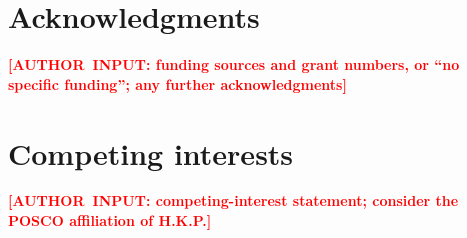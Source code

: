 \documentclass[a4paper,twocolumn,11pt,unpublished]{quantumarticle}
\newcommand{\authorinput}[1]{\textcolor{red}{\textbf{[\mbox{AUTHOR INPUT}: #1]}}}
\begin{document}
\section*{Acknowledgments}
\authorinput{funding sources and grant numbers, or ``no specific
funding''; any further acknowledgments}

\section*{Competing interests}
\authorinput{competing-interest statement; consider the POSCO
affiliation of H.K.P.}

\onecolumn
\appendix











\clearpage
\twocolumn


\end{document}
